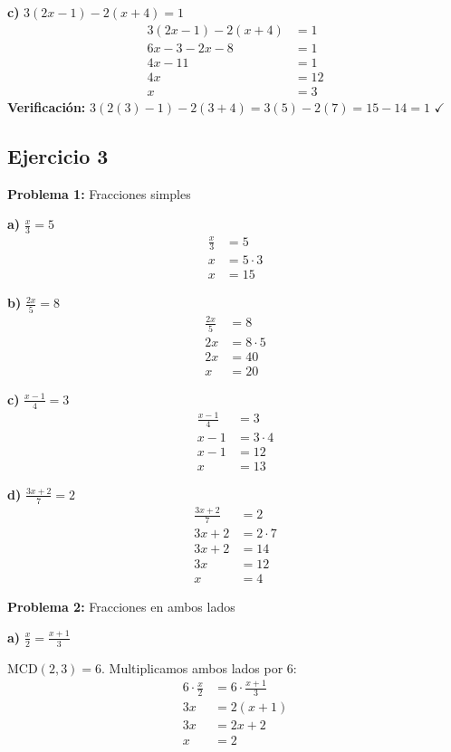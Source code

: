 \textbf{c)} $3(2x - 1) - 2(x + 4) = 1$
\begin{align}
3(2x - 1) - 2(x + 4) &= 1\\
6x - 3 - 2x - 8 &= 1\\
4x - 11 &= 1\\
4x &= 12\\
x &= 3
\end{align}
\textbf{Verificación:} $3(2(3) - 1) - 2(3 + 4) = 3(5) - 2(7) = 15 - 14 = 1$ $\checkmark$

\subsection*{Ejercicio 3}

\textbf{Problema 1:} Fracciones simples

\textbf{a)} $\frac{x}{3} = 5$
\begin{align}
\frac{x}{3} &= 5\\
x &= 5 \cdot 3\\
x &= 15
\end{align}

\textbf{b)} $\frac{2x}{5} = 8$
\begin{align}
\frac{2x}{5} &= 8\\
2x &= 8 \cdot 5\\
2x &= 40\\
x &= 20
\end{align}

\textbf{c)} $\frac{x-1}{4} = 3$
\begin{align}
\frac{x-1}{4} &= 3\\
x - 1 &= 3 \cdot 4\\
x - 1 &= 12\\
x &= 13
\end{align}

\textbf{d)} $\frac{3x+2}{7} = 2$
\begin{align}
\frac{3x+2}{7} &= 2\\
3x + 2 &= 2 \cdot 7\\
3x + 2 &= 14\\
3x &= 12\\
x &= 4
\end{align}

\textbf{Problema 2:} Fracciones en ambos lados

\textbf{a)} $\frac{x}{2} = \frac{x+1}{3}$

MCD$(2,3) = 6$. Multiplicamos ambos lados por 6:
\begin{align}
6 \cdot \frac{x}{2} &= 6 \cdot \frac{x+1}{3}\\
3x &= 2(x+1)\\
3x &= 2x + 2\\
x &= 2
\end{align}


